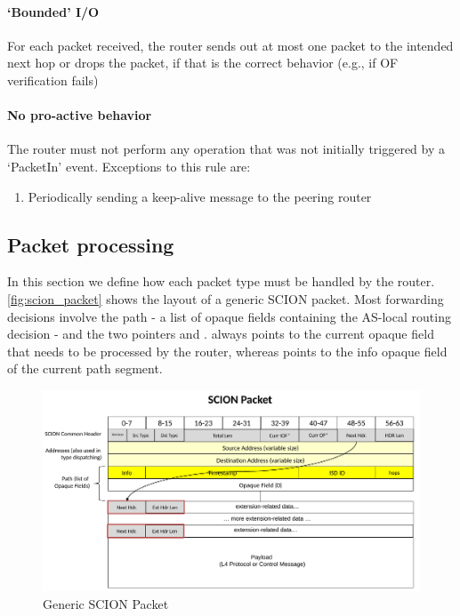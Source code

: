 \paragraph{‘Bounded’ I/O}
For each packet received, the router sends out at most one packet to the 
intended next hop or drops the packet, if that is the correct behavior (e.g., 
if OF verification fails)

\paragraph{No pro-active behavior}
The router must not perform any operation that was not initially triggered by 
a ‘PacketIn’ event. Exceptions to this rule are:
\begin{enumerate}
	\item Periodically sending a keep-alive message to the peering router
\end{enumerate}

\subsection{Packet processing}\label{sec:packet_processing}
In this section we define how each packet type must be handled by the 
router. \autoref{fig:scion_packet} shows the layout of a generic SCION packet. 
Most forwarding decisions involve the path - a list of opaque fields containing 
the AS-local routing decision - and the two pointers \currof and 
\curriof. \currof always points to the current opaque field that needs to be 
processed by the router, whereas \curriof points to the info opaque field of 
the current path segment.

\begin{figure}
\centering
\includegraphics[width=\textwidth]{figs/scion_packet}
\caption{Generic SCION Packet}
\label{fig:scion_packet}
\end{figure}

